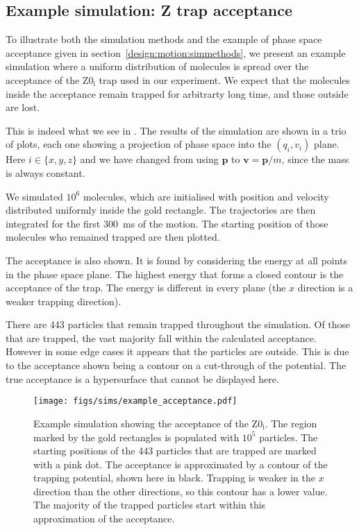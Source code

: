 \subsection{Example simulation: Z trap acceptance}

To illustrate both the simulation methods and the example of phase space
acceptance given in section~\ref{design:motion:simmethods}, we present an
example simulation where a uniform distribution of molecules is spread over the
acceptance of the $\mathrm{Z0_i}$ trap used in our experiment. We expect that
the molecules inside the acceptance remain trapped for arbitrarty long time,
and those outside are lost.

This is indeed what we see in . The results of
the simulation are shown in a trio of plots, each one showing a projection of
phase space into the $(q_i, v_i)$ plane. Here $i\in\{x, y, z\}$ and we have
changed from using $\mathbf{p}$ to $\mathbf{v} = \mathbf{p} / m$, since the
mass is always constant. 

We simulated $10^6$ \CaF{} molecules, which are initialised with position and
velocity distributed uniformly inside the gold rectangle. The trajectories are
then integrated for the first \SI{300}{\milli\second} of the motion. The
starting position of those molecules who remained trapped are then plotted.

The acceptance is also shown. It is found by considering the energy at all
points in the phase space plane. The highest energy that forms a closed contour
is the acceptance of the trap. The energy is different in every plane (the $x$
direction is a weaker trapping direction).

There are 443 particles that remain trapped throughout the simulation. Of those
that are trapped, the vast majority fall within the calculated acceptance.
However in some edge cases it appears that the particles are outside. This is
due to the acceptance shown being a contour on a cut-through of the potential.
The true acceptance is a hypersurface that cannot be displayed here.

\begin{figure}
  \centering
  \texttt{[image: figs/sims/example\_acceptance.pdf]}
  \caption{Example simulation showing the acceptance of the $\mathrm{Z0_i}$.
  The region marked by the gold rectangles is populated with $10^5$ particles.
  The starting positions of the 443 particles that are trapped are marked with a pink dot.
  The acceptance is approximated by a contour of the trapping potential, shown
  here in black. Trapping is weaker in the $x$ direction than the other
  directions, so this contour has a lower value. The majority of the trapped
  particles start within this approximation of the acceptance.}
  \label{design:fig:acceptance}
\end{figure}

